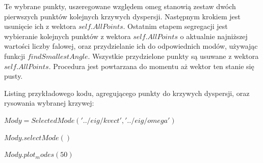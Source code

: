 Te wybrane punkty, uszeregowane względem omeg stanowią zestaw dwóch pierwszych punktów kolejnych krzywych dyspersji. Następnym krokiem jest usunięcie ich z wektora $self.AllPoints$. Ostatnim etapem segregacji jest wybieranie kolejnych punktów z wektora $self.AllPoints$ o aktualnie najniższej wartości liczby falowej, oraz przydzielanie ich do odpowiednich modów, używając funkcji $findSmallestAngle$. Wszystkie przydzielone punkty są usuwane z wektora $self.AllPoints$. Procedura jest powtarzana do momentu aż wektor ten stanie się pusty.

Listing przykładowego kodu, agregującego punkty do krzywych dyspersji, oraz rysowania wybranej krzywej:

$Mody = SelectedMode('../eig/kvect', '../eig/omega')$

$Mody.selectMode()$

$Mody.plot_modes(50)$

